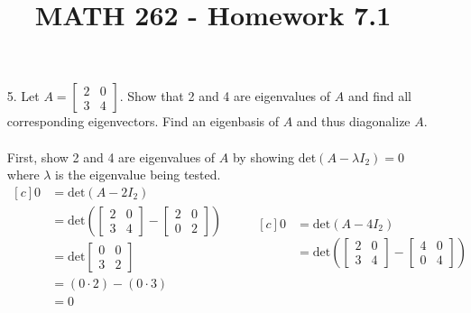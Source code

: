 \documentclass[letterpaper,12pt]{article}
\author{}
\title{MATH 262 - Homework 7.1}
\date{} %
\begin{document}
\maketitle

\begin{enumerate}
  \item[5.]
    Let $A = \begin{bmatrix}2 & 0 \\ 3 & 4\end{bmatrix}$. Show that 2 and 4 are eigenvalues of $A$ and find all corresponding eigenvectors. Find an eigenbasis of $A$ and thus diagonalize $A$. \\
    \\
    First, show 2 and 4 are eigenvalues of $A$ by showing det$(A - \lambda I_2) = 0$ where $\lambda$ is the eigenvalue being tested.
    \begin{equation*}
      \begin{aligned}[c]
        0 &= \text{det}(A - 2I_2) \\
        &= \text{det}\left(
          \begin{bmatrix}
            2 & 0 \\
            3 & 4
          \end{bmatrix}
          - \begin{bmatrix}
            2 & 0 \\
            0 & 2
          \end{bmatrix}
        \right) \\
        &= \text{det}\begin{bmatrix}
          0 & 0 \\
          3 & 2
        \end{bmatrix} \\
        &= (0 \cdot 2) - (0 \cdot 3) \\
        &= 0
      \end{aligned}
      \qquad
      \begin{aligned}[c]
        0 &= \text{det}(A - 4I_2) \\
        &= \text{det}\left(
          \begin{bmatrix}
            2 & 0 \\
            3 & 4
          \end{bmatrix}
          - \begin{bmatrix}
            4 & 0 \\
            0 & 4
          \end{bmatrix}
        \right) \\

\end{aligned}
\end{equation*}
\end{enumerate}
\end{document}
